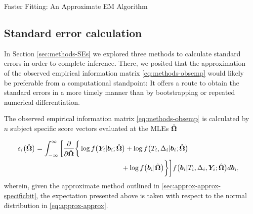 \begin{chapter}{\label{cha:approx}Faster Fitting: An Approximate EM Algorithm}
  \subsection{Standard error calculation}\label{sec:approx-SEs}
  In Section \ref{sec:methods-SEs} we explored three methods to calculate standard errors in order to complete inference. There, we posited that the approximation of the observed empirical information matrix \eqref{eq:methods-obsemp} would likely be preferable from a computational standpoint: It offers a route to obtain the standard errors in a more timely manner than by bootstrapping or repeated numerical differentiation.

  The observed empirical information matrix \eqref{eq:methods-obsemp} is calculated by $n$ subject specific score vectors evaluated at the MLEs $\hat{\bm{\Omega}}$

  \begin{equation}
    \begin{aligned}
        s_i\big(\hat{\bm{\Omega}}\big)=\int_{-\infty}^\infty\bigg[
                        \frac{\partial}{\partial\hat{\bm{\Omega}}}\bigg\{&\log f\big(\bm{Y}_i|\bm{b}_i;\hat{\bm{\Omega}}\big)+\log f\big(T_i,\Delta_i|\bm{b}_i;\hat{\bm{\Omega}}\big) \\&\qquad\qquad\qquad+ \log f\big(\bm{b}_i|\hat{\bm{\Omega}}\big)\bigg\}
                    \bigg] f\big(\bm{b}_i|T_i,\Delta_i,\bm{Y}_i;\hat{\bm{\Omega}}\big) d\bm{b}_i,
    \end{aligned}
  \label{eq:approx-score-equation}
  \end{equation}
  wherein, given the approximate method outlined in \ref{sec:approx-approx-specificbit}, the expectation presented above is taken with respect to the normal distribution in \eqref{eq:approx-approx}.


\end{chapter}
